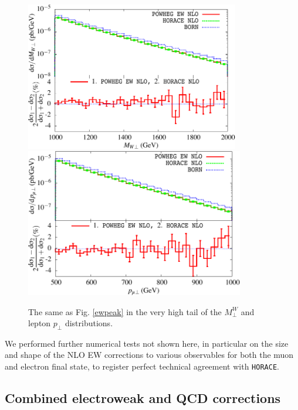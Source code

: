 \documentclass[11pt,a4paper]{article}
\begin{document}
\begin{figure}[h]
\begin{center}
\includegraphics[height=6.5cm]{Fig2a}\\
\includegraphics[height=6.5cm]{Fig2b}
\caption{The same as Fig. \ref{ewpeak} in the very high tail of the $M_\perp^W$ and lepton $p_\perp$ distributions.}
\label{ewfarpeak}
\end{center}
\end{figure}

We performed further numerical tests not shown here, in particular on the size and shape of the NLO EW corrections to 
various observables for both the muon and electron final state, 
to register perfect technical agreement with \texttt{HORACE}.


\subsection{Combined electroweak and QCD corrections}
\end{document}
